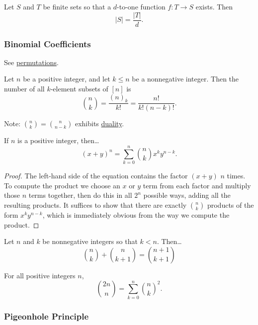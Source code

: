 \begin{theorem}
Let $S$ and $T$ be finite sets so that a $d$-to-one function $f : T \rightarrow S$ exists. Then
$$|S| = \frac{|T|}{d}.$$
\end{theorem}

\subsubsection{Binomial Coefficients}\label{binomials}

See \hyperref[permutation]{permutations}.

\begin{theorem}
Let $n$ be a positive integer, and let $k \leq n$ be a nonnegative integer. Then the number of all $k$-element subsets of $[n]$ is
$${n \choose k} = \frac{(n)_k}{k!} = \frac{n!}{k!(n-k)!}.$$
\end{theorem}

Note: ${n \choose k} = {n \choose n-k}$ exhibits \hyperref[duality]{duality}.

\begin{theorem}
If $n$ is a positive integer, then\dots
$$(x+y)^n = \sum_{k=0}^n {n \choose k} x^k y^{n-k}.$$ 
\end{theorem}

\begin{proof}
The left-hand side of the equation contains the factor $(x + y)$ $n$ times. To compute the product we choose an $x$ or $y$ term from each factor and multiply those $n$ terms together, then do this
in all $2^n$ possible ways, adding all the resulting products. It suffices to show that there are exactly ${n \choose k}$ products of the form $x^k y^{n-k}$, which is immediately obvious from the
way we compute the product.
\end{proof}

\begin{theorem}
Let $n$ and $k$ be nonnegative integers so that $k < n.$ Then\dots
$${n \choose k} + {n \choose k + 1} = {n + 1 \choose k + 1}$$
\end{theorem}

\begin{theorem}
For all positive integers $n$,
$${2n \choose n} = \sum^n_{k=0}{n \choose k}^2.$$
\end{theorem}

\subsubsection{Pigeonhole Principle}\label{pigeonholeprinciple}

